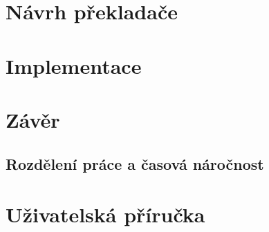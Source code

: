 \documentclass[ 12pt, a4paper]{article}
\begin{document}
\newpage
\section{Návrh překladače}


\newpage
\section{Implementace} 

\newpage
\section{Závěr}

\subsection{Rozdělení práce a časová náročnost}



\newpage
\section{Uživatelská příručka} 
\end{document}
